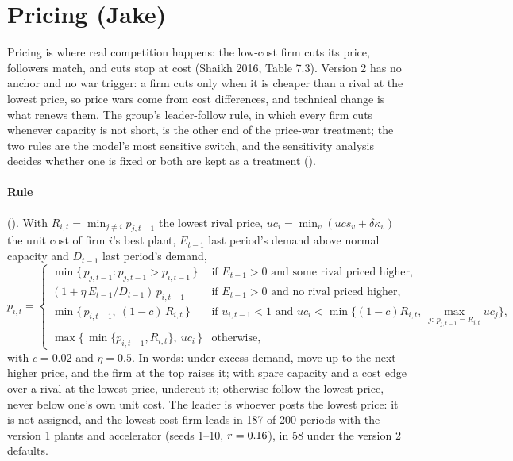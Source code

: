\section{Pricing (Jake)}\label{sec:pricing}

Pricing is where real competition happens: the low-cost firm cuts its price, followers
match, and cuts stop at cost (Shaikh 2016, Table 7.3). Version 2 has no anchor and no war
trigger: a firm cuts only when it is cheaper than a rival at the lowest price, so price wars
come from cost differences, and technical change is what renews them. The group's
leader-follow rule, in which every firm cuts whenever capacity is not short, is the other
end of the price-war treatment; the two rules are the model's most sensitive switch, and
the sensitivity analysis decides whether one is fixed or both are kept as a treatment
().

\paragraph{Rule} (). With
$R_{i,t} = \min_{j\neq i} p_{j,t-1}$ the lowest rival price,
$uc_i = \min_{v}(ucs_v + \delta\kappa_v)$ the unit cost of firm $i$'s best plant, $E_{t-1}$
last period's demand above normal capacity and $D_{t-1}$ last period's demand,
\[
p_{i,t} =
\begin{cases}
\min\{\, p_{j,t-1} : p_{j,t-1} > p_{i,t-1} \,\} & \text{if } E_{t-1} > 0
  \text{ and some rival priced higher}, \\
(1 + \eta\, E_{t-1}/D_{t-1})\, p_{i,t-1} & \text{if } E_{t-1} > 0
  \text{ and no rival priced higher}, \\
\min\{\, p_{i,t-1},\ (1-c)\,R_{i,t} \,\} & \text{if } u_{i,t-1} < 1 \text{ and }
  uc_i < \min\{(1-c)R_{i,t},\ \max_{j:\,p_{j,t-1}=R_{i,t}} uc_j\}, \\
\max\{\, \min\{p_{i,t-1}, R_{i,t}\},\ uc_i \,\} & \text{otherwise,}
\end{cases}
\]
with $c = 0.02$ and $\eta = 0.5$. In words: under excess demand, move up to the next higher
price, and the firm at the top raises it; with spare capacity and a cost edge over a rival
at the lowest price, undercut it; otherwise follow the lowest price, never below one's own
unit cost. The leader is whoever posts the lowest price: it is not assigned, and the
lowest-cost firm leads in 187 of 200 periods with the version 1 plants and accelerator
(seeds 1--10, $\bar r = 0.16$), in 58 under the version 2 defaults.

